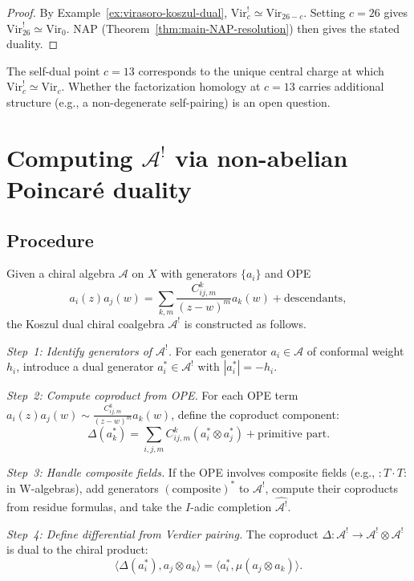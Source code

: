 \begin{example}
\begin{proof}
By Example~\ref{ex:virasoro-koszul-dual},
$\mathrm{Vir}_c^! \simeq \mathrm{Vir}_{26-c}$. Setting $c = 26$
gives $\mathrm{Vir}_{26}^! \simeq \mathrm{Vir}_0$.
NAP (Theorem~\ref{thm:main-NAP-resolution}) then gives the stated duality.
\end{proof}

\begin{remark}[Scope]
The self-dual point $c = 13$ corresponds to the unique central charge
at which $\mathrm{Vir}_c^! \simeq \mathrm{Vir}_c$.  Whether the
factorization homology at $c = 13$ carries additional structure
(e.g., a non-degenerate self-pairing) is an open question.
\end{remark}
\end{example}

\section{\texorpdfstring{Computing $\mathcal{A}^!$ via non-abelian Poincar\'e duality}{Computing the Koszul dual via NAP}}

\subsection{Procedure}
\label{alg:NAP-koszul}

Given a chiral algebra $\mathcal{A}$ on $X$ with generators $\{a_i\}$ and OPE
\[
a_i(z) a_j(w) = \sum_{k,m}\frac{C^k_{ij,m}}{(z-w)^m}a_k(w) + \text{descendants},
\]
the Koszul dual chiral coalgebra $\mathcal{A}^!$ is constructed as follows.

\emph{Step~1: Identify generators of $\mathcal{A}^!$.}
For each generator $a_i \in \mathcal{A}$ of conformal weight $h_i$, introduce a dual
generator $a_i^* \in \mathcal{A}^!$ with $|a_i^*| = -h_i$.

\emph{Step~2: Compute coproduct from OPE.}
For each OPE term $a_i(z)a_j(w) \sim \frac{C^k_{ij,m}}{(z-w)^m} a_k(w)$, define the coproduct component:
\[
\Delta(a_k^*)=\sum_{i,j,m}C^k_{ij,m}(a_i^* \otimes a_j^*)+\text{primitive part}.
\]

\emph{Step~3: Handle composite fields.}
If the OPE involves composite fields (e.g., $:T \cdot T:$ in W-algebras),
add generators $(\text{composite})^*$ to $\mathcal{A}^!$,
compute their coproducts from residue formulas,
and take the $I$-adic completion $\widehat{\mathcal{A}^!}$.

\emph{Step~4: Define differential from Verdier pairing.}
The coproduct $\Delta\colon \mathcal{A}^! \to \mathcal{A}^! \otimes \mathcal{A}^!$ is
dual to the chiral product:
\[
\langle \Delta(a_i^*), a_j \otimes a_k \rangle = \langle a_i^*, \mu(a_j \otimes a_k)\rangle.
\]

